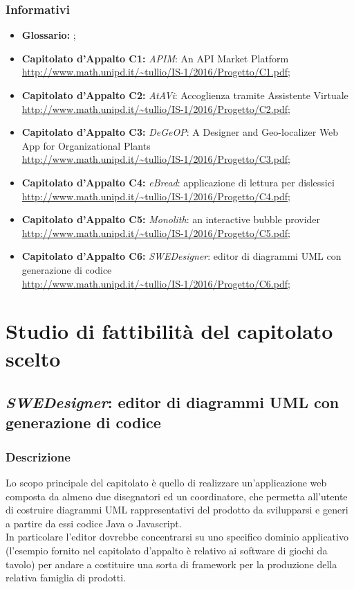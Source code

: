 		\subsubsection{Informativi}
		\begin{itemize}
			\item \textbf{Glossario: }\emph{\Glossario};
			\item \textbf{Capitolato d'Appalto C1:} \emph{APIM}: An API Market Platform
			\\ \url{http://www.math.unipd.it/~tullio/IS-1/2016/Progetto/C1.pdf};
			\item \textbf{Capitolato d'Appalto C2:} \emph{AtAVi}: Accoglienza tramite Assistente Virtuale
			\\ \url{http://www.math.unipd.it/~tullio/IS-1/2016/Progetto/C2.pdf};
			\item \textbf{Capitolato d'Appalto C3:} \emph{DeGeOP}: A Designer and Geo-localizer Web App for Organizational Plants
			\\ \url{http://www.math.unipd.it/~tullio/IS-1/2016/Progetto/C3.pdf};
			\item \textbf{Capitolato d'Appalto C4:} \emph{eBread}: applicazione di lettura per dislessici
			\\ \url{http://www.math.unipd.it/~tullio/IS-1/2016/Progetto/C4.pdf};
			\item \textbf{Capitolato d'Appalto C5:} \emph{Monolith}: an interactive bubble provider
			\\ \url{http://www.math.unipd.it/~tullio/IS-1/2016/Progetto/C5.pdf};
			\item \textbf{Capitolato d'Appalto C6:} \emph{SWEDesigner}: editor di diagrammi UML con generazione di codice
			\\ \url{http://www.math.unipd.it/~tullio/IS-1/2016/Progetto/C6.pdf};
		\end{itemize}
\newpage
	
\section{Studio di fattibilità del capitolato scelto}
	\subsection{\emph{SWEDesigner}: editor di diagrammi UML con generazione di codice}
		\subsubsection{Descrizione}
		Lo scopo principale del capitolato è quello di realizzare un'applicazione web composta da almeno due disegnatori
		ed un coordinatore, che permetta all'utente di costruire diagrammi UML rappresentativi del prodotto da svilupparsi e generi a partire da essi codice 
		Java o Javascript.
		\\In particolare l'editor dovrebbe concentrarsi su uno specifico dominio applicativo (l'esempio fornito nel capitolato d'appalto è relativo ai software 
		di giochi da tavolo) per andare a costituire una sorta di framework per la produzione della relativa famiglia di prodotti.
		
